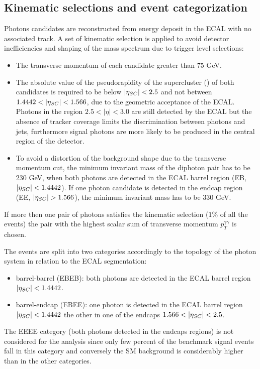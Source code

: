\subsection{Kinematic selections and event categorization}
\label{sec:event_cats}
Photons candidates are reconstructed from energy deposit in the ECAL with no associated track.
A set of kinematic selection is applied to avoid detector inefficiencies and shaping of the mass
spectrum due to trigger level selections:
\begin{itemize}
\item The transverse momentum of each candidate greater than $75$ GeV.
\item The absolute value of the pseudorapidity of the supercluster (\absScEta) of both
candidates is required to be below $|\eta_{SC}| < 2.5$ and not between $1.4442 < |\eta_{SC}| < 1.566$,
due to the geometric acceptance of the ECAL. Photons in the region $2.5 < |\eta| < 3.0$ are still detected by the ECAL
but the absence of tracker coverage limits the discrimination between photons and jets, furthermore signal photons
are more likely to be produced in the central region of the detector.
\item To avoid a distortion of the background shape due to the transverse momentum
  cut, the minimum invariant mass of the diphoton pair has to be $230$ GeV, when
both photons are detected in the ECAL barrel region (EB, $|\eta_{SC}| < 1.4442$). If one photon candidate
is detected in the endcap region (EE, $|\eta_{SC}| > 1.566$), the minimum invariant mass
has to be $330$ GeV.
\end{itemize}

If more then one pair of photons satisfies the kinematic selection ($1\%$ of all the events) the pair
with the highest scalar sum of transverse momentum $p_T^{\gamma\gamma}$ is chosen.

The events are split into two categories accordingly to the topology of the photon system in relation
to the ECAL segmentation:
\begin{itemize}
\item barrel-barrel (EBEB): both photons are detected in the ECAL barrel region $|\eta_{SC}| < 1.4442$.
\item barrel-endcap (EBEE): one photon is detected in the ECAL barrel region $|\eta_{SC}| < 1.4442$ the other
  in one of the endcaps $1.566 < |\eta_{SC}| < 2.5$.
\end{itemize}

The EEEE category (both photons detected in the endcaps regions) is not considered for the analysis
since only few percent of the benchmark signal events fall in this category and conversely the SM
background is considerably higher than in the other categories.

